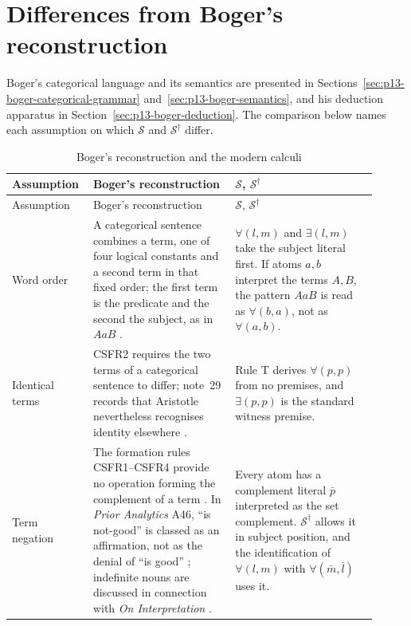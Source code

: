 \section{Differences from Boger's reconstruction}
\label{sec:p02-w02-p02-001-boger}

Boger's categorical language and its semantics are presented in
Sections~\ref{sec:p13-boger-categorical-grammar}
and~\ref{sec:p13-boger-semantics}, and his deduction apparatus in
Section~\ref{sec:p13-boger-deduction}. The comparison below names each
assumption on which \(\mathcal S\) and \(\mathcal S^\dagger\) differ.

\begin{longtable}{@{}p{0.17\linewidth}p{0.37\linewidth}p{0.37\linewidth}@{}}
\caption{Boger's reconstruction and the modern calculi}
\label{tab:p02-w02-p02-001-boger}\\
\hline
Assumption & Boger's reconstruction & \(\mathcal S\), \(\mathcal S^\dagger\) \\
\hline
\endfirsthead
\hline
Assumption & Boger's reconstruction & \(\mathcal S\), \(\mathcal S^\dagger\) \\
\hline
\endhead
Word order &
A categorical sentence combines a term, one of four logical constants and a
second term in that fixed order; the first term is the predicate and the
second the subject, as in \(AaB\)
\cite[pp.~130--131]{Boger2004UnderlyingLogic}. &
\(\forall(l,m)\) and \(\exists(l,m)\) take the subject literal first. If
atoms \(a,b\) interpret the terms \(A,B\), the pattern \(AaB\) is read as
\(\forall(b,a)\), not as \(\forall(a,b)\). \\
Identical terms &
CSFR2 requires the two terms of a categorical sentence to differ; note~29
records that Aristotle nevertheless recognises identity elsewhere
\cite[p.~131]{Boger2004UnderlyingLogic}. &
Rule T derives \(\forall(p,p)\) from no premises, and
\(\exists(p,p)\) is the standard witness premise. \\
Term negation &
The formation rules CSFR1--CSFR4 provide no operation forming the complement
of a term \cite[pp.~130--131]{Boger2004UnderlyingLogic}. In \emph{Prior
Analytics} A46, \enquote{is not-good} is classed as an affirmation, not as
the denial of \enquote{is good} \cite[p.~132]{Boger2004UnderlyingLogic};
indefinite nouns are discussed in connection with \emph{On Interpretation}
\cite[pp.~124--125]{Boger2004UnderlyingLogic}. &
Every atom has a complement literal \(\bar p\) interpreted as the set
complement. \(\mathcal S^\dagger\) allows it in subject position, and the
identification of \(\forall(l,m)\) with \(\forall(\bar m,\bar l)\) uses it. \\

\end{longtable}

